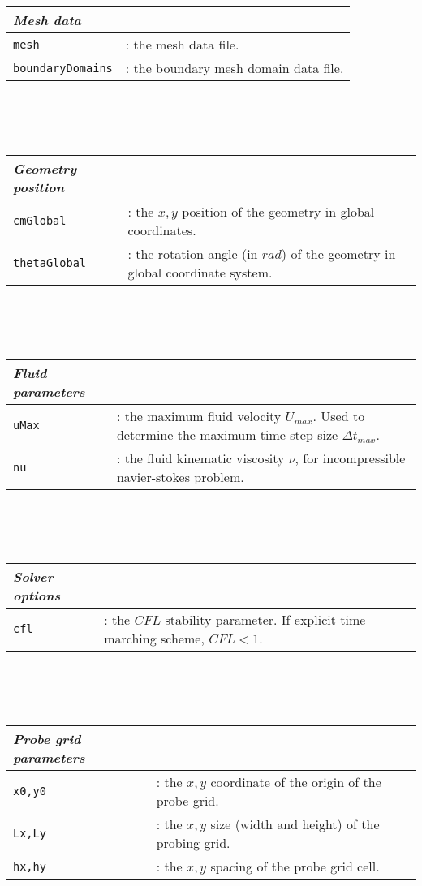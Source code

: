 	\begin{tabular}{lp{10cm}}
				\textit{Mesh data} & \\ \hline
				\texttt{mesh} &: the mesh data file.\\ 
				\texttt{boundaryDomains} &: the boundary mesh domain data file.\\ 			
	\end{tabular}\\ 
    \\ \\
	\begin{tabular}{lp{10cm}}
				\textit{Geometry position} & \\ \hline
				\texttt{cmGlobal} &: the $x,y$ position of the geometry in global coordinates.\\ 
				\texttt{thetaGlobal} &: the rotation angle (in $rad$) of the geometry in global coordinate system.\\ 			
	\end{tabular}\\
    \\ \\
	\begin{tabular}{lp{10cm}}
				\textit{Fluid parameters} & \\ \hline
				\texttt{uMax} &: the maximum fluid velocity $U_{max}$. Used to determine the maximum time step size $\Delta t_{max}$.\\ 
				\texttt{nu} &: the fluid kinematic viscosity $\nu$, for incompressible navier-stokes problem.\\ 			
	\end{tabular}\\	
    \\ \\
	\begin{tabular}{lp{10cm}}
				\textit{Solver options} & \\ \hline
				\texttt{cfl} &: the $CFL$ stability parameter. If explicit time marching scheme, $CFL<1$.\\ 		
	\end{tabular}\\	
    \\ \\
	\begin{tabular}{lp{10cm}}
				\textit{Probe grid parameters} & \\ \hline
				\texttt{x0,y0} &: the $x,y$ coordinate of the origin of the probe grid.\\ 
				\texttt{Lx,Ly} &: the $x,y$ size (width and height) of the probing grid.\\ 			
				\texttt{hx,hy} &: the $x,y$ spacing of the probe grid cell.\\ 							
	\end{tabular}\\	

